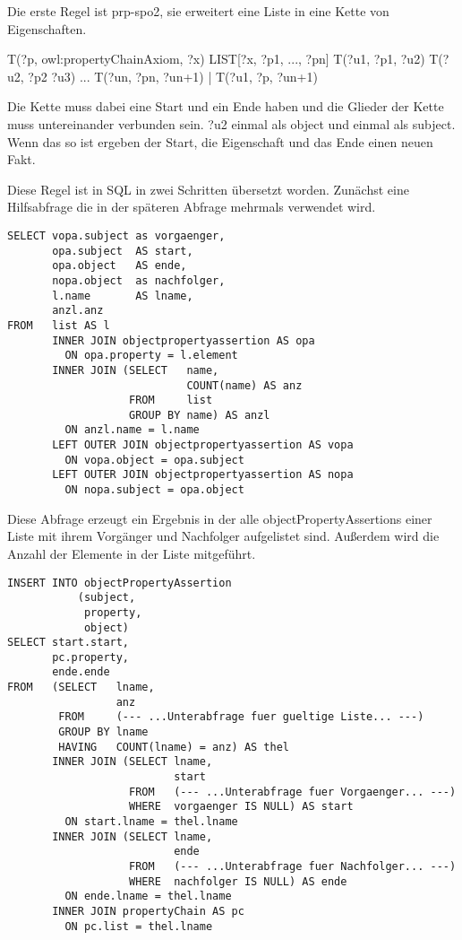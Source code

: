 Die erste Regel ist prp-spo2, sie erweitert eine Liste in eine Kette von Eigenschaften.

T(?p, owl:propertyChainAxiom, ?x)
LIST[?x, ?p1, ..., ?pn]
T(?u1, ?p1, ?u2)
T(?u2, ?p2 ?u3)
...
T(?un, ?pn, ?un+1) 	                      | T(?u1, ?p, ?un+1)

Die Kette muss dabei eine Start und ein Ende haben und die Glieder der Kette muss untereinander verbunden sein. ?u2 einmal als object und einmal als subject. Wenn das so ist ergeben der Start, die Eigenschaft und das Ende einen neuen Fakt.

Diese Regel ist in SQL in zwei Schritten übersetzt worden. Zunächst eine Hilfsabfrage die in der späteren Abfrage mehrmals verwendet wird.

\begin{lstlisting}
SELECT vopa.subject as vorgaenger,
       opa.subject  AS start,
       opa.object   AS ende,
       nopa.object  as nachfolger,
       l.name       AS lname,
       anzl.anz
FROM   list AS l
       INNER JOIN objectpropertyassertion AS opa
         ON opa.property = l.element
       INNER JOIN (SELECT   name,
                            COUNT(name) AS anz
                   FROM     list
                   GROUP BY name) AS anzl
         ON anzl.name = l.name
       LEFT OUTER JOIN objectpropertyassertion AS vopa
         ON vopa.object = opa.subject
       LEFT OUTER JOIN objectpropertyassertion AS nopa
         ON nopa.subject = opa.object
\end{lstlisting}

Diese Abfrage erzeugt ein Ergebnis in der alle objectPropertyAssertions einer Liste mit ihrem Vorgänger und Nachfolger aufgelistet sind. Außerdem wird die Anzahl der Elemente in der Liste mitgeführt.

\begin{lstlisting}
INSERT INTO objectPropertyAssertion
           (subject,
            property,
            object)
SELECT start.start,
       pc.property,
       ende.ende
FROM   (SELECT   lname,
                 anz
        FROM     (--- ...Unterabfrage fuer gueltige Liste... ---)
        GROUP BY lname
        HAVING   COUNT(lname) = anz) AS thel
       INNER JOIN (SELECT lname,
                          start
                   FROM   (--- ...Unterabfrage fuer Vorgaenger... ---)
                   WHERE  vorgaenger IS NULL) AS start
         ON start.lname = thel.lname
       INNER JOIN (SELECT lname,
                          ende
                   FROM   (--- ...Unterabfrage fuer Nachfolger... ---)
                   WHERE  nachfolger IS NULL) AS ende
         ON ende.lname = thel.lname
       INNER JOIN propertyChain AS pc
         ON pc.list = thel.lname
\end{lstlisting}

